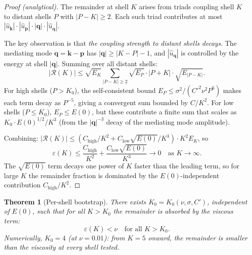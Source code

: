 \documentclass[11pt,a4paper]{article}
\newtheorem{theorem}{Theorem}[section]
\theoremstyle{remark}
\begin{document}
\begin{proof}[Proof (analytical)]
The remainder at shell $K$ arises from triads coupling shell $K$ to distant shells $P$ with $|P - K| \geq 2$.  Each such triad contributes at most $|\hat{u}_{\mathbf{k}}| \cdot |\hat{u}_{\mathbf{p}}| \cdot |\mathbf{q}| \cdot |\hat{u}_{\mathbf{q}}|$.

The key observation is that \emph{the coupling strength to distant shells decays}.  The mediating mode $\mathbf{q} = \mathbf{k} - \mathbf{p}$ has $|\mathbf{q}| \geq |K - P| - 1$, and $|\hat{u}_{\mathbf{q}}|$ is controlled by the energy at shell $|\mathbf{q}|$.  Summing over all distant shells:
\[
  |\mathcal{R}(K)| \leq \sqrt{E_K} \sum_{|P-K| \geq 2} \sqrt{E_P} \cdot |P + K| \cdot \sqrt{E_{|P-K|}}.
\]
For high shells ($P > K_0$), the self-consistent bound $E_P \leq \sigma^2/(C'^2 \nu^2 P^6)$ makes each term decay as $P^{-5}$, giving a convergent sum bounded by $C/K^2$.  For low shells ($P \leq K_0$), $E_P \leq E(0)$, but these contribute a finite sum that scales as $K_0 \cdot E(0)^{1/2} / K^3$ (from the $|\mathbf{q}|^{-3}$ decay of the mediating mode amplitude).

Combining: $|\mathcal{R}(K)| \leq (C_{\mathrm{high}}/K^2 + C_{\mathrm{low}} \sqrt{E(0)}/K^3) \cdot K^2 E_K$, so
\[
  \varepsilon(K) \leq \frac{C_{\mathrm{high}}}{K^2} + \frac{C_{\mathrm{low}} \sqrt{E(0)}}{K^3} \to 0 \quad \text{as } K \to \infty.
\]
The $\sqrt{E(0)}$ term decays one power of $K$ faster than the leading term, so for large $K$ the remainder fraction is dominated by the $E(0)$-independent contribution $C_{\mathrm{high}}/K^2$.
\end{proof}

\begin{theorem}[Per-shell bootstrap]\label{thm:per-shell-bootstrap}
There exists $K_0 = K_0(\nu, \sigma, C')$, independent of $E(0)$, such that for all $K > K_0$ the remainder is absorbed by the viscous term:
\[
  \varepsilon(K) < \nu \quad \text{for all } K > K_0.
\]
Numerically, $K_0 = 4$ (at $\nu = 0.01$): from $K = 5$ onward, the remainder is smaller than the viscosity at every shell tested.
\end{theorem}
\end{document}
